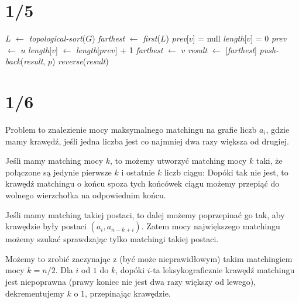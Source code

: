 \documentclass[a4paper, 12pt]{article}
\newcommand{\+}{\enspace}
\begin{document}
\section*{1/5}
\begin{algorithm}
	\begin{algorithmic}
		\State $L$ $←$ \textit{topological-sort}($G$)
		\State \textit{farthest} $←$ \textit{first}($L$)
			\State \textit{prev}[$v$] = null
			\State \textit{length}[$v$] = 0
				\State \textit{prev} $←$ $u$
			\EndIf
			\EndFor
				\State \textit{length}[$v$] $←$ \textit{length}[$prev$] + 1
					\State \textit{farthest} $←$ $v$
				\EndIf
			\EndIf
		\EndFor
		\State \textit{result} $←$ [\textit{farthest}]
			\State \textit{push-back}(\textit{result}, $p$)
		\EndWhile
		\State \Return \textit{reverse}(\textit{result})
	\end{algorithmic}
\end{algorithm}

\section*{1/6}
Problem to znalezienie mocy maksymalnego matchingu na grafie
liczb $a_i$, gdzie mamy krawędź, jeśli jedna liczba jest co najmniej dwa razy większa od drugiej.

Jeśli mamy matching mocy $k$,
to możemy utworzyć matching mocy $k$ taki,
że połączone są jedynie pierwsze $k$ i ostatnie $k$ liczb ciągu:
Dopóki tak nie jest, to krawędź matchingu o końcu spoza tych końcówek ciągu możemy przepiąć do wolnego wierzchołka na odpowiednim końcu.

Jeśli mamy matching takiej postaci, to dalej
możemy poprzepinać go tak, aby krawędzie były postaci
$(a_i, a_{n-k+i})$.
Zatem mocy największego matchingu możemy szukać sprawdzając
tylko matchingi takiej postaci.

Możemy to zrobić zaczynając z (być może nieprawidłowym)
takim matchingiem mocy $k=n/2$.
Dla $i$ od $1$ do $k$, dopóki $i$-ta leksykograficznie krawędź
matchingu jest niepoprawna (prawy koniec nie jest dwa razy większy od lewego),
dekrementujemy $k$ o $1$, przepinając krawędzie.
\end{document}
